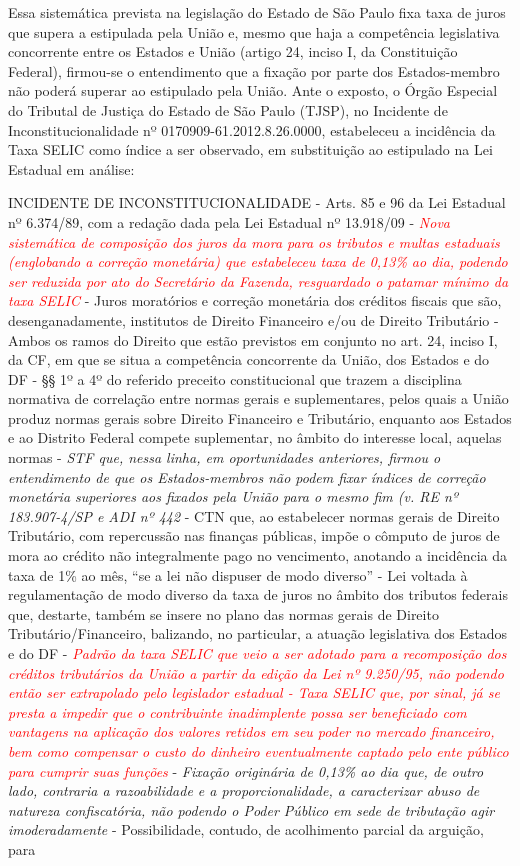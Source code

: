 Essa sistemática prevista na legislação do Estado de São Paulo fixa taxa de juros que supera a estipulada pela União e, mesmo que haja a competência legislativa concorrente entre os Estados e União (artigo 24, inciso I, da Constituição Federal), firmou-se o entendimento que a fixação por parte dos Estados-membro não poderá superar ao estipulado pela União. Ante o exposto, o Órgão Especial do Tributal de Justiça do Estado de São Paulo (TJSP), no Incidente de Inconstitucionalidade nº 0170909-61.2012.8.26.0000, estabeleceu a incidência da Taxa SELIC como índice a ser observado, em substituição ao estipulado na Lei Estadual em análise:

INCIDENTE DE INCONSTITUCIONALIDADE - Arts. 85 e 96 da Lei Estadual nº 6.374/89, com a redação dada pela Lei Estadual nº 13.918/09 - \textcolor{red}{\emph{Nova sistemática de composição dos juros da mora para os tributos e multas estaduais (englobando a correção monetária) que estabeleceu taxa de 0,13\% ao dia, podendo ser reduzida por ato do Secretário da Fazenda, resguardado o patamar mínimo da taxa SELIC}} - Juros moratórios e correção monetária dos créditos fiscais que são, desenganadamente, institutos de Direito Financeiro e/ou de Direito Tributário - Ambos os ramos do Direito que estão previstos em conjunto no art. 24, inciso I, da CF, em que se situa a competência concorrente da União, dos Estados e do DF - §§ 1º a 4º do referido preceito constitucional que trazem a disciplina normativa de correlação entre normas gerais e suplementares, pelos quais a União produz normas gerais sobre Direito Financeiro e Tributário, enquanto aos Estados e ao Distrito Federal compete suplementar, no âmbito do interesse local, aquelas normas - \emph{STF que, nessa linha, em oportunidades anteriores, firmou o entendimento de que os Estados-membros não podem fixar índices de correção monetária superiores aos fixados pela União para o mesmo fim (v. RE nº 183.907-4/SP e ADI nº 442} - CTN que, ao estabelecer normas gerais de Direito Tributário, com repercussão nas finanças públicas, impõe o cômputo de juros de mora ao crédito não integralmente pago no vencimento, anotando a incidência da taxa de 1\% ao mês, “se a lei não dispuser de modo diverso” - Lei voltada à regulamentação de modo diverso da taxa de juros no âmbito dos tributos federais que, destarte, também se insere no plano das normas gerais de Direito Tributário/Financeiro, balizando, no particular, a atuação legislativa dos Estados e do DF - \textcolor{red}{\emph{Padrão da taxa SELIC que veio a ser adotado para a recomposição dos créditos tributários da União a partir da edição da Lei nº 9.250/95, não podendo então ser extrapolado pelo legislador estadual - Taxa SELIC que, por sinal, já se presta a impedir que o contribuinte inadimplente possa ser beneficiado com vantagens na aplicação dos valores retidos em seu poder no mercado financeiro, bem como compensar o custo do dinheiro eventualmente captado pelo ente público para cumprir suas funções}} - \emph{Fixação originária de 0,13\% ao dia que, de outro lado, contraria a razoabilidade e a proporcionalidade, a caracterizar abuso de natureza confiscatória, não podendo o Poder Público em sede de tributação agir imoderadamente} - Possibilidade, contudo, de acolhimento parcial da arguição, para 